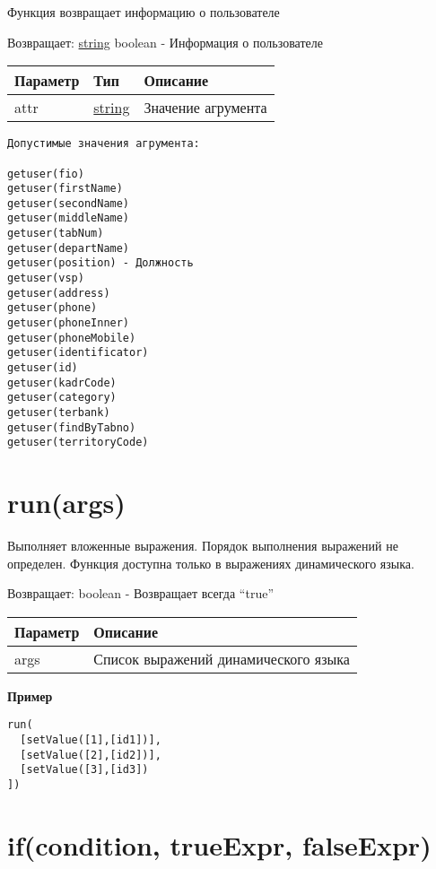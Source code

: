 Функция возвращает информацию о пользователе

Возвращает: \protect\hyperlink{string}{string} \textbar{} boolean
- Информация о пользователе

\begin{longtable}[]{@{}lll@{}}
\toprule
Параметр & Тип & Описание\tabularnewline
\midrule
\endhead
attr & \protect\hyperlink{string}{string} & Значение
агрумента\tabularnewline
\bottomrule
\end{longtable}

\begin{verbatim}
Допустимые значения агрумента:

getuser(fio)
getuser(firstName)
getuser(secondName)
getuser(middleName)
getuser(tabNum)
getuser(departName)
getuser(position) - Должность
getuser(vsp)
getuser(address)
getuser(phone)
getuser(phoneInner)
getuser(phoneMobile)
getuser(identificator)
getuser(id)
getuser(kadrCode)
getuser(category)
getuser(terbank)
getuser(findByTabno)
getuser(territoryCode)
\end{verbatim}

\hypertarget{runargs-boolean}{%
\section{run(args)}\label{runargs-boolean}}

Выполняет вложенные выражения. Порядок выполнения выражений не
определен. Функция доступна только в выражениях динамического языка.

Возвращает: boolean - Возвращает всегда ``true''

\begin{longtable}[]{@{}ll@{}}
\toprule
Параметр & Описание\tabularnewline
\midrule
\endhead
args & Список выражений динамического языка\tabularnewline
\bottomrule
\end{longtable}

\textbf{Пример}

\begin{verbatim}
run(
  [setValue([1],[id1])],
  [setValue([2],[id2])],
  [setValue([3],[id3])
])
\end{verbatim}

\hypertarget{ifcondition-trueexpr-falseexpr-boolean}{%
\section{if(condition, trueExpr, falseExpr)}\label{ifcondition-trueexpr-falseexpr-boolean}}


